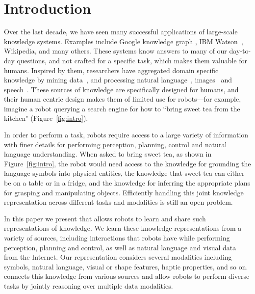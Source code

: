 \section{Introduction}
Over the last decade, we have seen many successful applications of large-scale knowledge systems.
Examples include  Google knowledge graph \cite{dong2014knowledge}, IBM Watson~\cite{ferrucci2010}, Wikipedia,
 and many others.
These systems know answers to many of our day-to-day questions, and
 not crafted for a specific task, which makes them valuable for humans.
Inspired by them, researchers have aggregated domain specific knowledge by mining
data~\cite{dbpedia2007, freebase2008}, and processing natural
language~\cite{nell2010}, images~\cite{imagenet2009} and
speech~\citep{mohamed2011deep}.  These sources of knowledge are specifically designed for humans, and their  human centric design makes them of limited use for robots---for example, imagine a robot querying a search engine
 for how to ``bring sweet tea from the kitchen" (Figure~\ref{fig:intro}).


 In order to perform a task, robots require access to a large variety of information with finer details for performing
 perception, planning, control and natural language understanding. When asked to bring sweet tea, as shown in Figure~\ref{fig:intro}, the robot
 would need access to the knowledge for grounding the language symbols into physical entities,
  the knowledge that sweet tea can either be on a table or in a fridge, and the knowledge for inferring the
 appropriate plans for grasping and manipulating objects. Efficiently handling this joint knowledge representation across different
 tasks and modalities is still an open problem.

In this paper we present \robobrain{} that allows robots to learn and share such representations of knowledge.
We learn these knowledge representations from a variety of sources, including interactions that robots have while performing perception,
planning and control, as well as natural language and visual data from the Internet.
Our representation considers several modalities including symbols, natural language, visual or shape features, haptic properties, and so on. \robobrain{} connects this knowledge from various sources and allow robots to perform diverse tasks by jointly reasoning over multiple data modalities.  %

